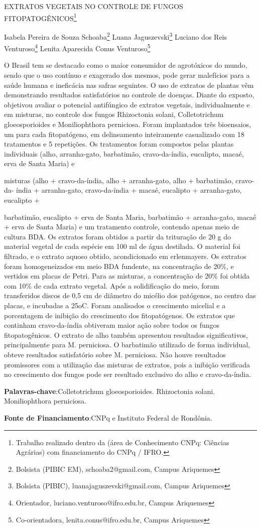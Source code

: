 \documentclass[article,12pt,onesidea,4paper,english,brazil]{abntex2}
\begin{document}
	
	
	\frenchspacing 
	
	\begin{center}
		\LARGE EXTRATOS VEGETAIS NO CONTROLE DE FUNGOS FITOPATOGÊNICOS\footnote{
			Trabalho realizado dentro da (área de Conhecimento CNPq: Ciências Agrárias) com financiamento
			do CNPq / IFRO.}
		
		\normalsize
		Isabela Pereira de Souza Schoaba\footnote{Bolsista (PIBIC EM), schoaba2@gmail.com, Campus Ariquemes} 
	Luana Jaguszevski\footnote{Bolsista (PIBIC), luanajaguszevski@gmail.com, Campus Ariquemes} 
	Luciano dos Reis Venturoso\footnote{Orientador, luciano.venturoso@ifro.edu.br, Campus Ariquemes} 
	Lenita Aparecida Conus Venturoso\footnote{
			Co-orientadora, lenita.conus@ifro.edu.br, Campus Ariquemes} 
	\end{center}
	
	\noindent O Brasil tem se destacado como o maior consumidor de agrotóxicos do mundo,
	sendo que o uso contínuo e exagerado dos mesmos, pode gerar malefícios para a
	saúde humana e ineficácia nas safras seguintes. O uso de extratos de plantas vêm
	demonstrando resultados satisfatórios no controle de doenças. Diante do exposto,
	objetivou avaliar o potencial antifúngico de extratos vegetais, individualmente e em
	misturas, no controle dos fungos Rhizoctonia solani, Colletotrichum gloeosporioides
	e Moniliophthora perniciosa. Foram implantados três bioensaios, um para cada
	fitopatógeno, em delineamento inteiramente casualizado com 18 tratamentos e 5
	repetições. Os tratamentos foram compostos pelas plantas individuais (alho,
	arranha-gato, barbatimão, cravo-da-índia, eucalipto, macaé, erva de Santa Maria) e
	
	misturas (alho + cravo-da-índia, alho + arranha-gato, alho + barbatimão, cravo-da-
	índia + arranha-gato, cravo-da-índia + macaé, eucalipto + arranha-gato, eucalipto +
	
	barbatimão, eucalipto + erva de Santa Maria, barbatimão + arranha-gato, macaé +
	erva de Santa Maria) e um tratamento controle, contendo apenas meio de cultura
	BDA. Os extratos foram obtidos a partir da trituração de 20 g do material vegetal de
	cada espécie em 100 ml de água destilada. O material foi filtrado, e o extrato aquoso
	obtido, acondicionado em erlenmayers. Os extratos foram homogeneizados em meio
	BDA fundente, na concentração de 20\%, e vertidos em placas de Petri. Para as
	misturas, a concentração de 20\% foi obtida com 10\% de cada extrato vegetal. Após
	a solidificação do meio, foram transferidos discos de 0,5 cm de diâmetro do micélio
	dos patógenos, no centro das placas, e incubadas a 25oC. Foram analisados o
	crescimento micelial e a porcentagem de inibição do crescimento dos fitopatógenos.
	Os extratos que continham cravo-da-índia obtiveram maior ação sobre todos os
	fungos fitopatogênicos. O extrato de alho também apresentou resultados
	significativos, principalmente para M. perniciosa. O barbatimão utilizado de forma
	individual, obteve resultados satisfatório sobre M. perniciosa. Não houve resultados
	promissores com a utilização das misturas de extratos, pois a inibição verificada no
	crescimento dos fungos pode ser resultado exclusivo do alho e cravo-da-índia.
	
	\vspace{\onelineskip}
	
	\noindent
	\textbf{Palavras-chave}:Colletotrichum gloeosporioides. Rhizoctonia solani. Moniliophthora
	perniciosa.
	
	\noindent
	\textbf{Fonte de Financiamento}:CNPq e Instituto Federal de Rondônia.
	
\end{document}
